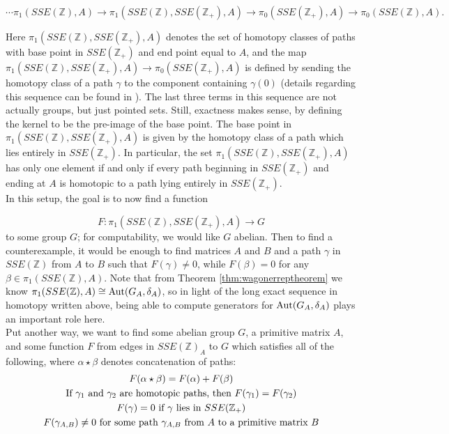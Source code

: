\documentclass{amsart}
\newcommand{\ai}{\index[authors]}
\theoremstyle{definition}
\theoremstyle{definition}
\newcommand{\aut}{\textnormal{Aut}}
\numberwithin{equation}{subsection}
\begin{document}
$$ \cdots \pi_{1}(SSE(\mathbb{Z}),A) \to \pi_{1}(SSE(\mathbb{Z}),SSE(\mathbb{Z}_{+}),A) \to \pi_{0}(SSE(\mathbb{Z}_{+}),A) \to \pi_{0}(SSE(\mathbb{Z}),A).$$

Here $\pi_{1}(SSE(\mathbb{Z}),SSE(\mathbb{Z}_{+}),A)$ denotes the set of homotopy classes of paths with base point in $SSE(\mathbb{Z}_{+})$ and end point equal to $A$, and the map $\pi_{1}(SSE(\mathbb{Z}),SSE(\mathbb{Z}_{+}),A) \to \pi_{0}(SSE(\mathbb{Z}_{+}),A)$ is defined by sending the homotopy class of a path $\gamma$ to the component containing $\gamma(0)$ (details regarding this sequence can be found in \cite[Ch. 4, Thm. 4.3]{HatcherBook}). The last three terms in this sequence are not actually groups, but just pointed sets. Still, exactness makes sense, by defining the kernel to be the pre-image of the base point. The base point in $\pi_{1}(SSE(\mathbb{Z}),SSE(\mathbb{Z}_{+}),A)$ is given by the homotopy class of a path which lies entirely in $SSE(\mathbb{Z}_{+})$. In particular, the set $\pi_{1}(SSE(\mathbb{Z}),SSE(\mathbb{Z}_{+}),A)$ has only one element if and only if every path beginning in $SSE(\mathbb{Z}_{+})$ and ending at $A$ is homotopic to a path lying entirely in $SSE(\mathbb{Z}_{+})$.\\

In this setup, the goal is to now find a function

\begin{equation*}
F \colon \pi_{1}\left(SSE(\mathbb{Z}),SSE(\mathbb{Z}_{+}),A\right) \to G
\end{equation*}
to some group $G$; for computability, we would like $G$ abelian. Then to find a counterexample, it would be enough to find matrices $A$ and $B$ and a path $\gamma$ in $SSE(\mathbb{Z})$ from $A$ to $B$ such that $F(\gamma) \ne 0$, while $F(\beta) = 0$ for any $\beta \in \pi_{1}(SSE(\mathbb{Z}),A)$. Note that from Theorem \ref{thm:wagonerreptheorem}\ai{Wagoner, J.B.} we know $\pi_{1}(SSE(\mathbb{Z}),A) \cong \aut(G_{A},\delta_{A})$, so in light of the long exact sequence in homotopy written above, being able to compute generators for $\aut(G_{A},\delta_{A})$ plays an important role here.\\

Put another way, we want to find some abelian group $G$, a primitive matrix $A$, and some function $F$ from edges in $SSE(\mathbb{Z})_{A}$ to $G$ which satisfies all of the following, where $\alpha \star \beta$ denotes concatenation of paths:
\begin{gather}\label{eqn:FandG1}
F(\alpha \star \beta) = F(\alpha) + F(\beta)\\
\label{eqn:FandG2}
\textnormal{If } \gamma_{1} \textnormal{ and } \gamma_{2} \textnormal{ are homotopic paths, then } F(\gamma_{1}) = F(\gamma_{2})\\
\label{eqn:FandG3}
F(\gamma) = 0 \textnormal{ if } \gamma \textnormal{ lies in } SSE(\mathbb{Z}_{+})\\
\label{eqn:Fnonvanishing}
F(\gamma_{A,B}) \ne 0 \textnormal{ for some path } \gamma_{A,B} \textnormal{ from } A \textnormal{ to a primitive matrix } B
\end{gather}
\end{document}
